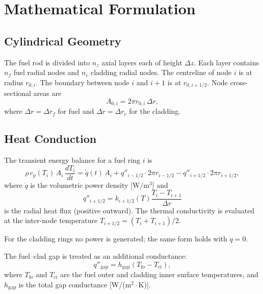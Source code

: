 \documentclass[11pt,a4paper]{article}
\begin{document}
\section{Mathematical Formulation}

\subsection{Cylindrical Geometry}

The fuel rod is divided into $n_z$ axial layers each of height $\Delta z$.
Each layer contains $n_f$ fuel radial nodes and $n_c$ cladding radial nodes.
The centreline of node $i$ is at radius $r_{0,i}$.  The boundary between
node $i$ and $i+1$ is at $r_{0,i+1/2}$.  Node cross-sectional areas are
\begin{equation}
  A_{0,i} = 2\pi r_{0,i} \, \Delta r,
\end{equation}
where $\Delta r = \Delta r_f$ for fuel and $\Delta r = \Delta r_c$ for the
cladding.

\subsection{Heat Conduction}

The transient energy balance for a fuel ring $i$ is
\begin{equation}
  \rho \, c_p(T_i) \, A_i \, \frac{dT_i}{dt}
    = \dot{q}(t) \, A_i + q''_{i-1/2} \cdot 2\pi r_{i-1/2}
                        - q''_{i+1/2} \cdot 2\pi r_{i+1/2},
  \label{eq:energy_ode}
\end{equation}
where $\dot{q}$ is the volumetric power density [W/m$^3$] and
\begin{equation}
  q''_{i+1/2} = k_{i+1/2}(T) \frac{T_i - T_{i+1}}{\Delta r}
\end{equation}
is the radial heat flux (positive outward).  The thermal conductivity is
evaluated at the inter-node temperature $T_{i+1/2} = (T_i + T_{i+1})/2$.

For the cladding rings no power is generated; the same form holds with
$\dot{q}=0$.

The fuel–clad gap is treated as an additional conductance:
\begin{equation}
  q''_{\mathrm{gap}} = h_{\mathrm{gap}} (T_{\mathrm{fo}} - T_{\mathrm{ci}}),
  \label{eq:gap_flux}
\end{equation}
where $T_{\mathrm{fo}}$ and $T_{\mathrm{ci}}$ are the fuel outer and cladding
inner surface temperatures, and $h_{\mathrm{gap}}$ is the total gap
conductance [W/(m$^2\cdot$K)].
\end{document}
